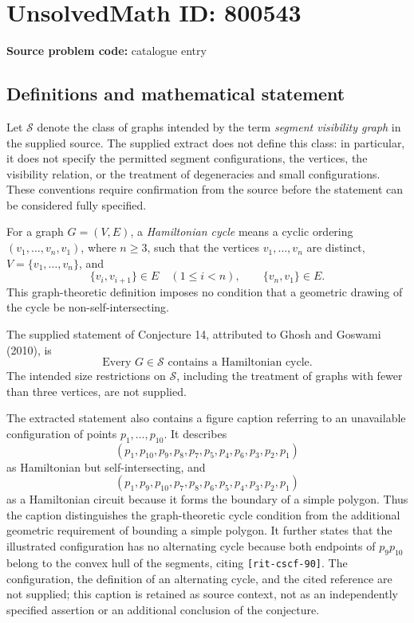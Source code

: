 \documentclass[11pt]{article}
\begin{document}
\section*{UnsolvedMath ID: 800543}
\textbf{Source problem code:} catalogue entry
\subsection{Definitions and mathematical statement}
Let \(\mathcal S\) denote the class of graphs intended by the term \emph{segment visibility graph} in the supplied source. The supplied extract does not define this class: in particular, it does not specify the permitted segment configurations, the vertices, the visibility relation, or the treatment of degeneracies and small configurations. These conventions require confirmation from the source before the statement can be considered fully specified.

For a graph \(G=(V,E)\), a \emph{Hamiltonian cycle} means a cyclic ordering \((v_1,\ldots,v_n,v_1)\), where \(n\geq 3\), such that the vertices \(v_1,\ldots,v_n\) are distinct, \(V=\{v_1,\ldots,v_n\}\), and
\[
\{v_i,v_{i+1}\}\in E\quad(1\leq i<n),
\qquad \{v_n,v_1\}\in E.
\]
This graph-theoretic definition imposes no condition that a geometric drawing of the cycle be non-self-intersecting.

The supplied statement of Conjecture 14, attributed to Ghosh and Goswami (2010), is
\[
\text{Every }G\in\mathcal S\text{ contains a Hamiltonian cycle.}
\]
The intended size restrictions on \(\mathcal S\), including the treatment of graphs with fewer than three vertices, are not supplied.

The extracted statement also contains a figure caption referring to an unavailable configuration of points \(p_1,\ldots,p_{10}\). It describes
\[
(p_1,p_{10},p_9,p_8,p_7,p_5,p_4,p_6,p_3,p_2,p_1)
\]
as Hamiltonian but self-intersecting, and
\[
(p_1,p_9,p_{10},p_7,p_8,p_6,p_5,p_4,p_3,p_2,p_1)
\]
as a Hamiltonian circuit because it forms the boundary of a simple polygon. Thus the caption distinguishes the graph-theoretic cycle condition from the additional geometric requirement of bounding a simple polygon. It further states that the illustrated configuration has no alternating cycle because both endpoints of \(p_9p_{10}\) belong to the convex hull of the segments, citing \texttt{[rit-cscf-90]}. The configuration, the definition of an alternating cycle, and the cited reference are not supplied; this caption is retained as source context, not as an independently specified assertion or an additional conclusion of the conjecture.
\end{document}
